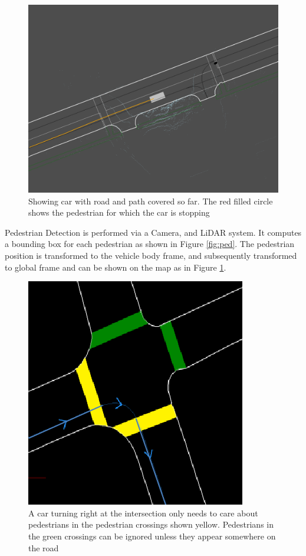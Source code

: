 \documentclass[letterpaper, 10 pt, conference]{ieeeconf}  %
\begin{document}
\begin{figure}[thpb]
  \centering
  \includegraphics[width=1.0\columnwidth]{graphics/screenshot-objectmap.png}
  \caption{Showing car with road and path covered so far. The red filled circle shows the pedestrian for which the car is stopping}
  \label{fig:car}
\end{figure}

Pedestrian Detection is performed via a Camera, and LiDAR system. It computes a bounding 
box for each pedestrian as shown in Figure \ref{fig:ped}. The pedestrian position is 
transformed to the vehicle body frame, and subsequently transformed to global frame and 
can be shown on the map as in Figure \ref{fig:car}.

\begin{figure}[thpb]
  \centering
  \includegraphics[width=0.5\columnwidth]{graphics/IntersectionCrosswalks.png}
  \caption{A car turning right at the intersection only needs to care about pedestrians in the 
pedestrian crossings shown yellow. Pedestrians in the green crossings can be ignored unless they
appear somewhere on the road}
  \label{fig:intersect}
\end{figure}
\end{document}
